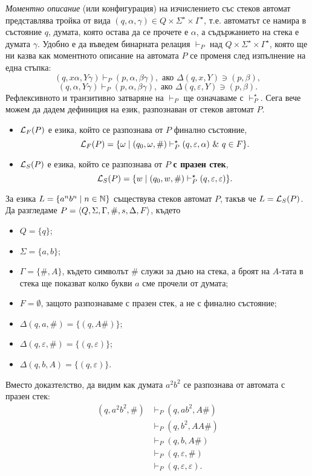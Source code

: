 {\em Моментно описание} (или конфигурация) на изчислението със стеков автомат представлява тройка от вида $(q,\alpha,\gamma) \in Q\times\Sigma^\star\times\Gamma^\star$,
т.е. автоматът се намира в състояние $q$, думата, която остава да се прочете е $\alpha$,
а съдържанието на стека е думата $\gamma$.
Удобно е да въведем бинарната релация $\vdash_P$ над $Q\times\Sigma^\star\times\Gamma^\star$,
която ще ни казва как моментното описание на автомата $P$ се променя след изпълнение на една стъпка:
\[(q,x\alpha,Y\gamma) \vdash_P (p,\alpha,\beta\gamma), \text{ ако } \Delta(q,x,Y) \ni (p,\beta),\]
\[(q,\alpha,Y\gamma) \vdash_P (p,\alpha,\beta\gamma), \text{ ако } \Delta(q,\varepsilon,Y) \ni (p,\beta).\]
Рефлексивното и транзитивно затваряне на $\vdash_P$ ще означаваме с $\vdash^\star_P$.
Сега вече можем да дадем дефиниция на език, разпознаван от стеков автомат $P$.
\begin{itemize}
\item
  $\mathcal{L}_F(P)$ е езика, който се разпознава от $P$ { финално състояние},
  \[\L_F(P) = \{\omega \mid (q_0,\omega,\#) \vdash^\star_P (q,\varepsilon,\alpha)\ \&\ q \in F\}.\]    
\item
  $\mathcal{L}_S(P)$ е езика, който се разпознава от $P$  {\bf с празен стек},
  \[\mathcal{L}_S(P) = \{w\mid (q_0,w,\#) \vdash^\star_P (q,\varepsilon,\varepsilon)\}.\]    
\end{itemize}

\begin{example}
  \label{ex:anbn}
  За езика $L = \{a^nb^n\mid n\in\mathbb{N}\}$ съществува стеков автомат $P$, такъв че
  $L = \mathcal{L}_S(P)$.
  Да разгледаме $P = \langle{Q,\Sigma,\Gamma,\#,s,\Delta,F}\rangle$, където
  \begin{itemize}
  \item
    $Q = \{q\}$;
  \item
    $\Sigma = \{a,b\}$;
  \item
    $\Gamma = \{\#,A\}$, където символът $\#$ служи за дъно на стека, а броят на $A$-тата в стека ще показват колко букви $a$ сме прочели от думата;
  \item
    $F = \emptyset$, защото разпознаваме с празен стек, а не с финално състояние;
  \item 
    $\Delta(q,a,\#) = \{(q, A\#)\}$;
  \item 
    $\Delta(q,\varepsilon,\#) = \{(q,\varepsilon)\}$;
  \item 
    $\Delta(q,b,A) = \{(q,\varepsilon)\}$.
  \end{itemize}
  Вместо доказтелство, да видим как думата $a^2b^2$ се разпознава от автомата с празен стек:
  \begin{align*}
    (q,a^2b^2,\#) & \vdash_P (q,ab^2,A\#) \\
    & \vdash_P (q,b^2, AA\#)\\
    & \vdash_P (q,b,A\#)\\
    & \vdash_P (q,\varepsilon,\#)\\
    & \vdash_P (q,\varepsilon,\varepsilon).
  \end{align*}
\end{example}

